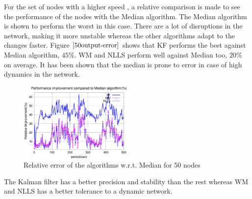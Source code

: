 \documentclass[journal]{IEEEtran}
\begin{document}
For the set of nodes with a higher speed , a relative comparison is made to see the performance of the nodes with the Median algorithm.
The Median algorithm is shown to perform the worst in this case. There are a lot of disruptions in the network, making it more unstable whereas the other algorithms adapt to the changes faster. Figure $\ref{50output-error}$ shows that KF performs the best against Median algorithm, $45\%$. WM and NLLS perform well against Median too, $20\%$ on average. It has been shown that the median is prone to error in case of high dynamics in the network.
\begin{figure}
\centering \includegraphics[width=0.5\textwidth]{50output-error}
\caption{Relative error of the algorithms w.r.t. Median for 50 nodes}
\label{50output-error}
\end{figure}
The Kalman filter has a better precision and stability than the rest whereas WM and NLLS has a better tolerance to a dynamic network.
\end{document}

